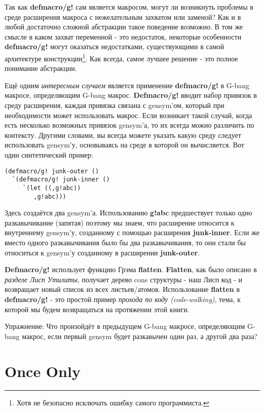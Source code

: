 Так как \textbf{defmacro/g!} сам является макросом, могут ли возникнуть проблемы в среде расширения макроса с нежелательным захватом или заменой? Как и в любой достаточно сложной абстракции такое поведение возможно. В том же смысле в каком захват переменной - это недостаток, некоторые особенности \textbf{defmacro/g!} могут оказаться недостатками, существующими в самой архитектуре конструкции\footnote{Хотя не безопасно исключать ошибку самого программиста.}. Как всегда, самое лучшее решение - это полное понимание абстракции.

Ещё одним \emph{интересным случаем} является применение \textbf{defmacro/g!} в G-bang макросе, определяющим G-bang макрос. \textbf{Defmacro/g!} вводит набор привязок в среду расширения, каждая привязка связана с gensym'ом, который при необходимости может использовать макрос. Если возникает такой случай, когда есть несколько возможных привязок gensym'а, то их всегда можно различить по контексту. Другими словами, вы всегда можете указать какую среду следует использовать gensym'у, основываясь на среде в которой он вычисляется. Вот один синтетический пример:

\begin{verbatim}
(defmacro/g! junk-outer ()
  `(defmacro/g! junk-inner ()
     `(let ((,g!abc))
        ,g!abc)))
\end{verbatim}

Здесь создаётся два gensym'а. Использованию \textbf{g!abc} предшествует только одно разкавычивание (запятая) поэтому мы знаем, что расширение относится к внутреннему gensym'у, созданному с помощью расширения \textbf{junk-inner}. Если же вместо одного разкавычивания было бы два разкавычивания, то они стали бы относиться к gensym'у созданному в расширении \textbf{junk-outer}.

\textbf{Defmacro/g!} использует функцию Грэма \textbf{flatten}. \textbf{Flatten}, как было описано в \emph{разделе Лисп Утилиты}, получает дерево cons структуры - наш Лисп код - и возвращает новый список из всех листьев/атомов. Использование \textbf{flatten} в \textbf{defmacro/g!} - это простой пример \emph{прохода по коду (code-walking)}, тема, к которой мы будем возвращаться на протяжении этой книги.

Упражнение: Что произойдёт в предыдущем G-bang макросе, определяющим G-bang макрос, если первый gensym будет разкавычен один раз, а другой два раза?

\section{Once Only}\label{section_once_only}

